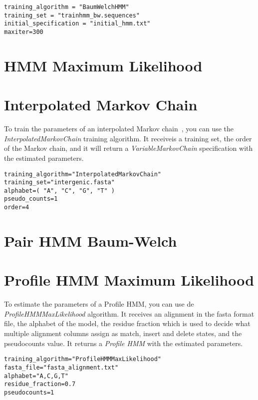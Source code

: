 \begin{Verbatim}[frame=single, label=train.txt]
training_algorithm = "BaumWelchHMM"
training_set = "trainhmm_bw.sequences"
initial_specification = "initial_hmm.txt"
maxiter=300
\end{Verbatim}


\section{HMM Maximum Likelihood}

\section{Interpolated Markov Chain}

To train the parameters of an interpolated Markov chain~\cite{Salzberg1998}, you can use the \textit{InterpolatedMarkovChain} training algorithm. It receiveis a training set, the order of the Markov chain, and it will return a \textit{VariableMarkovChain} specification with the estimated parameters.

\begin{Verbatim}[frame=single,label=train.txt]
training_algorithm="InterpolatedMarkovChain"
training_set="intergenic.fasta"
alphabet=( "A", "C", "G", "T" )
pseudo_counts=1
order=4
\end{Verbatim}


\section{Pair HMM Baum-Welch}

\section{Profile HMM Maximum Likelihood}
To estimate the parameters of a Profile HMM, you can use de \textit{ProfileHMMMaxLikelihood} algorithm. It receives an alignment in the fasta format file, the alphabet of the model, the residue fraction which is used to decide what multiple alignment columns assign as match, insert and delete states, and the pseudocounts value. It returns a \textit{Profile HMM} with the estimated parameters.

\begin{Verbatim}[frame=single,label=train.txt]
training_algorithm="ProfileHMMMaxLikelihood"
fasta_file="fasta_alignment.txt"
alphabet="A,C,G,T"
residue_fraction=0.7
pseudocounts=1
\end{Verbatim}



